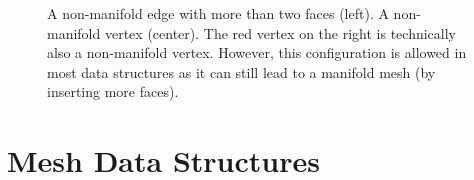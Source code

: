 \begin{figure}[t]
  
  \caption{A non-manifold edge with more than two faces (left). A non-manifold vertex (center). The red vertex on the right is technically also a non-manifold vertex. However, this configuration is allowed in most data structures as it can still lead to a manifold mesh (by inserting more faces).}
\end{figure}


\section{Mesh Data Structures}
